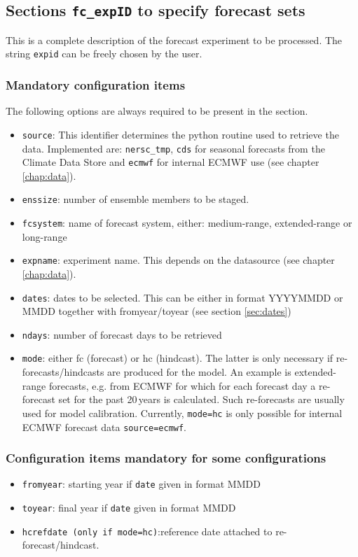 \documentclass[DIV=10, parskip=full]{scrreprt}
\newcommand{\notimplement}[1]{#1}
\begin{document}
\subsection{Sections \texttt{fc\_expID} to specify forecast sets} \label{sec:config_fcsets}
This is a complete description of the forecast experiment to be processed. The string \texttt{expid} can be freely chosen by the user.

\subsubsection{Mandatory configuration items}
The following options are always required to be present in the section.
\begin{itemize}
 \item \texttt{source}: This identifier determines the python routine used to retrieve the data. Implemented are:  \texttt{nersc\_tmp}, \texttt{cds} for seasonal forecasts from the Climate Data Store and \texttt{ecmwf} for internal ECMWF use (see chapter \ref{chap:data}).
 \item \texttt{enssize}: number of ensemble members to be staged. 
 \item \texttt{fcsystem}: name of forecast system, either: medium-range, extended-range or long-range
 \item \texttt{expname}: experiment name. This depends on the datasource (see chapter \ref{chap:data}).
 \item \texttt{dates}: dates to be selected. This can be either in format YYYYMMDD or MMDD together with fromyear/toyear (see section \ref{sec:dates})
 \item \texttt{ndays}: number of forecast days to be retrieved
 \item \texttt{mode}: either fc (forecast) or hc (hindcast). The latter is only necessary if re-forecasts/hindcasts are produced for the model. An example is extended-range forecasts, e.g. from ECMWF for which for each forecast day a re-forecast set for the past 20\,years is calculated. Such re-forecasts are usually used for model calibration. \notimplement{Currently, \texttt{mode=hc} is only possible for internal ECMWF forecast data \texttt{source=ecmwf}}.

\end{itemize}

\subsubsection{Configuration items mandatory for some configurations}
\begin{itemize}
	 \item \texttt{fromyear}: starting year if \texttt{date} given in format MMDD
	\item \texttt{toyear}: final year if \texttt{date} given in format MMDD
 \item \texttt{hcrefdate (only if mode=hc)}:reference date attached to re-forecast/hindcast. 
\end{itemize}
\end{document}

